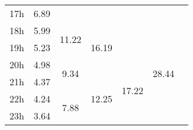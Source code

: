 \begin{center}
\begin{tabular}{l || c | c | c | c | c | c |}
17h & \multirow{1}{*}{ 6.89 }  & & & & & \\\cline{1-1}\cline{2-2}\cline{3-3}\cline{5-5}
18h & \multirow{1}{*}{ 5.99 }  & \multirow{2}{*}{ 11.22 }  & \multirow{3}{*}{ 16.19 }  & & \multirow{6}{*}{ 28.44 }  & \\\cline{1-1}
19h & \multirow{1}{*}{ 5.23 }  & & & & & \\\cline{1-1}\cline{2-2}\cline{4-4}
20h & \multirow{1}{*}{ 4.98 }  & \multirow{2}{*}{ 9.34 }  & & \multirow{4}{*}{ 17.22 }  & & \\\cline{1-1}\cline{3-3}
21h & \multirow{1}{*}{ 4.37 }  & & \multirow{3}{*}{ 12.25 }  & & & \\\cline{1-1}\cline{2-2}
22h & \multirow{1}{*}{ 4.24 }  & \multirow{2}{*}{ 7.88 }  & & & & \\\cline{1-1}
23h & \multirow{1}{*}{ 3.64 }  & & & & & \\\cline{1-1}\cline{2-2}\cline{3-3}\cline{4-4}\cline{5-5}\cline{6-6}
\end{tabular}
\end{center}